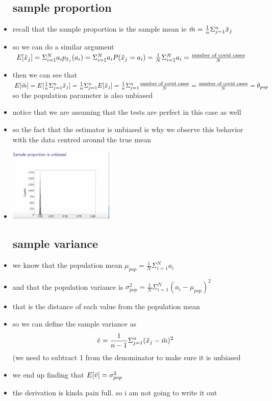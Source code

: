 \documentclass{article}
\begin{document}
\begin{itemize}
\subsection{sample proportion}
\item recall that the sample proportion is the sample mean ie $\Tilde{m}=\frac{1}{n}\Sigma_{j=1}^{n}\Tilde{x}_j$
\item so we can do a similar argument  $E[\Tilde{x}_j]=\Sigma_{i=1}^{N}a_ip_{\Tilde{x}_j}(a_i)=\Sigma_{i=1}^{N}a_iP(\Tilde{x}_j=a_i)=\frac{1}{N}\Sigma_{i=1}^{N}a_i=\frac{\text{number of covid cases}}{N}$
\item then we can see that 
$E[\Tilde{m}]=E[\frac{1}{n}\Sigma_{j=1}^{n}\Tilde{x}_j]=\frac{1}{n}\Sigma_{j=1}^{n}E[\Tilde{x}_j]=\frac{1}{n}\Sigma_{j=1}^{n}\frac{\text{number of covid cases}}{N}=\frac{\text{number of covid cases}}{N}=\theta_{pop}$ so the population parameter is also unbiased
\item notice that we are assuming that the tests are perfect in this case as well
\item so the fact that the estimator is unbiased is why we observe this behavior with the data centred around the true mean 
\item\includegraphics[width=5cm]{notes/week_3/Video-1:RANDOM-SAMPLING-AND-ESTIMATION-BIAS/immages/v1_2.jpg}
\subsection{sample variance}
\item we know that the population mean $\mu_{pop}=\frac{1}{N}\Sigma_{i=1}^{N}a_i$
\item and that the population variance is $\sigma_{pop}^{2}=\frac{1}{N}\Sigma_{i=1}^{N}(a_i-\mu_{pop})^{2}$
\item that is the distance of each value from the population mean 
\item so we can define the sample variance as $$\Tilde{v}=\frac{1}{n-1}\Sigma_{j=1}^{n}(\Tilde{x}_j-\Tilde{m})^{2}$$ (we need to subtract 1 from the denominator to make sure it is unbiased
\item we end up finding that $E[\Tilde{v}]=\sigma_{pop}^{2}$
\item the derivation is kinda pain full. so i am not going to write it out 
\end{itemize}
\end{document}
